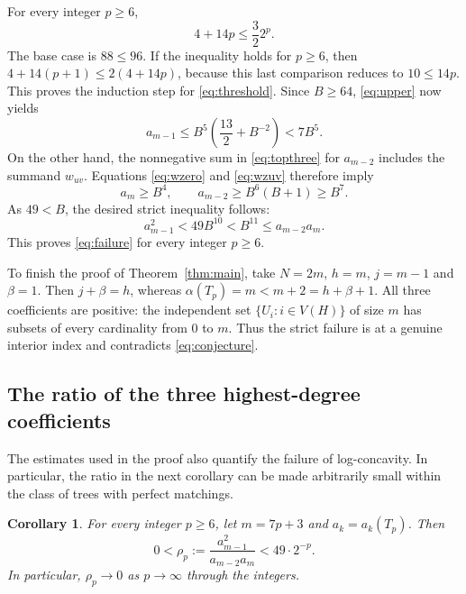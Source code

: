 \documentclass[11pt,a4paper]{article}
\newtheorem{corollary}[theorem]{Corollary}
\theoremstyle{remark}
\numberwithin{equation}{section}
\begin{document}
For every integer $p\geq6$,
\begin{equation}
 4+14p\leq \frac{3}{2}2^p.
 \label{eq:threshold}
\end{equation}
The base case is $88\leq96$. If the inequality holds for $p\geq6$,
then $4+14(p+1)\leq2(4+14p)$, because this last comparison reduces
to $10\leq14p$. This proves the induction step for
\eqref{eq:threshold}. Since $B\geq64$, \eqref{eq:upper} now yields
\begin{equation}
 a_{m-1}\leq B^5\left(\frac{13}{2}+B^{-2}\right)<7B^5.
 \label{eq:upperfinal}
\end{equation}
On the other hand, the nonnegative sum in \eqref{eq:topthree} for $a_{m-2}$ includes
the summand $w_{uv}$. Equations \eqref{eq:wzero} and
\eqref{eq:wzuv} therefore imply
\begin{equation}
 a_m\geq B^4,\qquad
 a_{m-2}\geq B^6(B+1)\geq B^7.
 \label{eq:lower}
\end{equation}
As $49<B$, the desired strict inequality follows:
\[
 a_{m-1}^{2}<49B^{10}<B^{11}\leq a_{m-2}a_m.
\]
This proves \eqref{eq:failure} for every integer $p\geq6$.

To finish the proof of Theorem~\ref{thm:main}, take $N=2m$, $h=m$,
$j=m-1$ and $\beta=1$. Then $j+\beta=h$, whereas
$\alpha(T_p)=m<m+2=h+\beta+1$. All three coefficients are positive:
the independent set $\{U_i:i\in V(H)\}$ of size $m$ has subsets of every
cardinality from $0$ to $m$. Thus the strict failure is at a genuine
interior index and contradicts \eqref{eq:conjecture}.


\subsection{The ratio of the three highest-degree coefficients}\label{sec:ratio}

The estimates used in the proof also quantify the failure of
log-concavity. In particular, the ratio in the next corollary can be
made arbitrarily small within the class of trees with perfect matchings.

\begin{corollary}\label{cor:ratio}
For every integer $p\geq6$, let $m=7p+3$ and $a_k=a_k(T_p)$.
Then
\begin{equation}\label{eq:ratio-bound}
 0<\rho_p:=\frac{a_{m-1}^2}{a_{m-2}a_m}<49\cdot2^{-p}.
\end{equation}
In particular, $\rho_p\to0$ as $p\to\infty$ through the integers.
\end{corollary}
\end{document}
